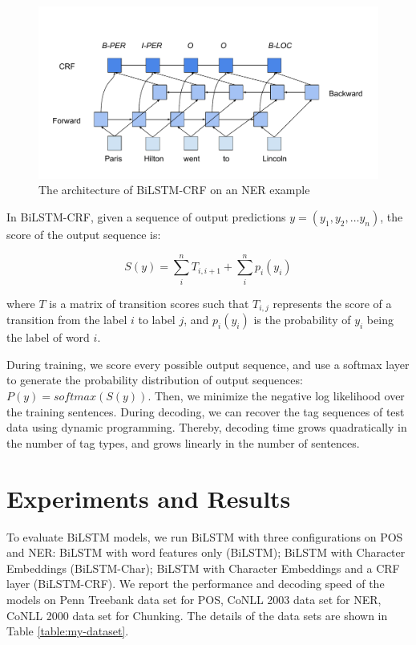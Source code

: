 \begin{figure}
  \centering
  \includegraphics[scale=0.6]{bilstmcrf}
 \caption{The architecture of BiLSTM-CRF on an NER example}
  \label{fig:bilstmcrf}
\end{figure}

In BiLSTM-CRF, given a sequence of output predictions $y=\left( y_{1},y_{2},\ldots y_{n}\right)$, the score of the output sequence is:

\begin{equation}
S\left( y\right)=\sum _{i}^{n}T_{i,i+1}+\sum _{i}^{n}p_{i}\left(y_{i}\right)
\end{equation}

\noindent
where $T$ is a matrix of transition scores such that $T_{i,j}$ represents the score of a transition from the label $i$ to label $j$, and $p_{i}\left(y_{i}\right)$ is the probability of $y_{i}$ being the label of word $i$.

During training, we score every possible output sequence, and use a softmax layer to generate the probability distribution of output sequences: $P\left( y\right) = \textit{softmax}(S\left( y\right))$. Then, we minimize the negative log likelihood over the training sentences. During decoding, we can recover the tag sequences of test data using dynamic programming. Thereby, decoding time grows quadratically in the number of tag types, and grows linearly in the number of sentences.

\section{Experiments and Results}

To evaluate BiLSTM models, we run BiLSTM with three configurations on POS and NER: BiLSTM with word features only (BiLSTM); BiLSTM with Character Embeddings (BiLSTM-Char); BiLSTM with Character Embeddings and a CRF layer (BiLSTM-CRF). We report the performance and decoding speed of the models on Penn Treebank data set for POS, CoNLL 2003 data set for NER, CoNLL 2000 data set for Chunking. The details of the data sets are shown in Table \ref{table:my-dataset}.

